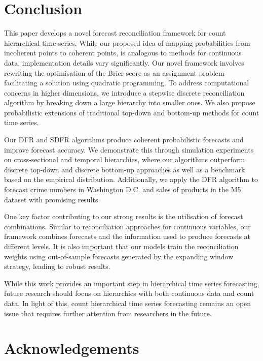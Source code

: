 \documentclass[a4paper,review,12pt,authoryear]{elsarticle}
\theoremstyle{definition}
\begin{document}
     \section{Conclusion}
     \label{sec:conclusion}

     This paper develops a novel forecast reconciliation framework for count hierarchical time series.
     While our proposed idea of mapping probabilities from incoherent points to coherent points, is analogous to methods for continuous data, implementation details vary significantly.
     Our novel framework involves rewriting the optimisation of the Brier score as an assignment problem facilitating a solution using quadratic programming. 
     To address computational concerns in higher dimensions, we introduce a stepwise discrete reconciliation algorithm by breaking down a large hierarchy into smaller ones.
     We also propose probabilistic extensions of traditional top-down and bottom-up methods for count time series.

     Our DFR and SDFR algorithms produce coherent probabilistic forecasts and improve forecast accuracy.
     We demonstrate this through simulation experiments on cross-sectional and temporal hierarchies, where our algorithms outperform discrete top-down and discrete bottom-up approaches as well as a benchmark based on the empirical distribution. Additionally, we apply the DFR algorithm to forecast crime numbers in Washington D.C. and sales of products in the M5 dataset with promising results.
     
     One key factor contributing to our strong results is the utilisation of forecast combinations.
     Similar to reconciliation approaches for continuous variables, our framework combines forecasts and the information used to produce forecasts at different levels.
     It is also important that our models train the reconciliation weights using out-of-sample forecasts generated by the expanding window strategy, leading to robust results.


     While this work provides an important step in hierarchical time series forecasting, future research should focus on hierarchies with both continuous data and count data. In light of this, count hierarchical time series forecasting remains an open issue that requires further attention from researchers in the future.

\section*{Acknowledgements}
\end{document}
